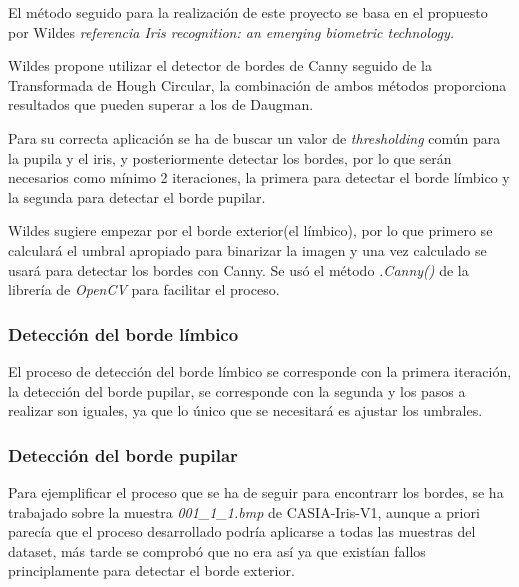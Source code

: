 El método seguido para la realización de este proyecto se basa en el propuesto por Wildes \emph{referencia Iris recognition: an emerging biometric technology.} 

Wildes propone utilizar el detector de bordes de Canny seguido de la Transformada de Hough Circular, la combinación de ambos métodos proporciona resultados que pueden superar a los de Daugman.

Para su correcta aplicación se ha de buscar un valor de \emph{thresholding} común para la pupila y el iris, y posteriormente detectar los bordes, por lo que serán necesarios como mínimo 2 iteraciones, la primera para detectar el borde límbico y la segunda para detectar el borde pupilar.

Wildes sugiere empezar por el borde exterior(el límbico), por lo que primero se calculará el umbral apropiado para binarizar la imagen y una vez calculado se usará para detectar los bordes con Canny.
Se usó el método \emph{.Canny()} de la librería de 
\emph{OpenCV} para facilitar el proceso.

\subsubsection{Detección del borde límbico}


El proceso de detección del borde límbico se corresponde con la primera iteración, la detección del borde pupilar, se corresponde con la segunda y los pasos a realizar son iguales, ya que  lo único que se necesitará es ajustar los umbrales.

\subsubsection{Detección del borde pupilar}




Para ejemplificar el proceso que se ha de seguir para encontrarr los bordes, se ha trabajado sobre la muestra \emph{001\_1\_1.bmp} de CASIA-Iris-V1, aunque a priori parecía que el proceso desarrollado podría aplicarse a todas las muestras del dataset, más tarde se comprobó que no era así ya que existían fallos principlamente para detectar el borde exterior.
